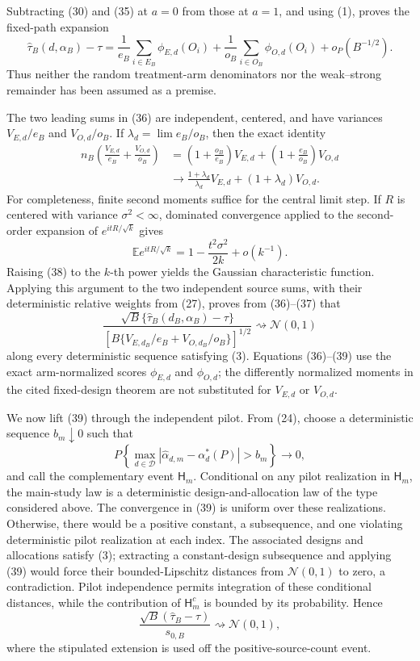 Subtracting (30) and (35) at \(a=0\) from those at \(a=1\), and using (1), proves the fixed-path expansion
\[
 \widehat\tau_B(d,\alpha_B)-\tau
 =\frac1{e_B}\sum_{i\in E_B}\phi_{E,d}(O_i)
  +\frac1{o_B}\sum_{i\in O_B}\phi_{O,d}(O_i)
  +o_P(B^{-1/2}).                                            \tag{36}
\]
Thus neither the random treatment-arm denominators nor the weak--strong remainder has been assumed as a premise.

The two leading sums in (36) are independent, centered, and have variances \(V_{E,d}/e_B\) and \(V_{O,d}/o_B\).  If \(\lambda_d=\lim e_B/o_B\), then the exact identity
\[
\begin{aligned}
 n_B\left(\frac{V_{E,d}}{e_B}+\frac{V_{O,d}}{o_B}\right)
 &=\left(1+\frac{o_B}{e_B}\right)V_{E,d}
  +\left(1+\frac{e_B}{o_B}\right)V_{O,d}\\
 &\longrightarrow
 \frac{1+\lambda_d}{\lambda_d}V_{E,d}
 +(1+\lambda_d)V_{O,d}.
\end{aligned}                                                \tag{37}
\]
For completeness, finite second moments suffice for the central limit step.  If \(R\) is centered with variance \(\sigma^2<\infty\), dominated convergence applied to the second-order expansion of \(e^{itR/\sqrt{k}}\) gives
\[
 \mathbb E e^{itR/\sqrt{k}}
 =1-\frac{t^2\sigma^2}{2k}+o(k^{-1}).                       \tag{38}
\]
Raising (38) to the \(k\)-th power yields the Gaussian characteristic function.  Applying this argument to the two independent source sums, with their deterministic relative weights from (27), proves from (36)--(37) that
\[
 \frac{\sqrt B\{\widehat\tau_B(d_B,\alpha_B)-\tau\}}
 {\left[B\{V_{E,d_B}/e_B+V_{O,d_B}/o_B\}\right]^{1/2}}
 \rightsquigarrow\mathcal N(0,1)                            \tag{39}
\]
along every deterministic sequence satisfying (3).  Equations (36)--(39) use the exact arm-normalized scores \(\phi_{E,d}\) and \(\phi_{O,d}\); the differently normalized moments in the cited fixed-design theorem are not substituted for \(V_{E,d}\) or \(V_{O,d}\).

We now lift (39) through the independent pilot.  From (24), choose a deterministic sequence \(b_m\downarrow0\) such that
\[
 P\left\{\max_{d\in\mathcal D}
 |\widehat\alpha_{d,m}-\alpha_d^*(P)|>b_m\right\}
 \longrightarrow0,                                         \tag{40}
\]
and call the complementary event \(\mathsf H_m\).  Conditional on any pilot realization in \(\mathsf H_m\), the main-study law is a deterministic design-and-allocation law of the type considered above.  The convergence in (39) is uniform over these realizations.  Otherwise, there would be a positive constant, a subsequence, and one violating deterministic pilot realization at each index.  The associated designs and allocations satisfy (3); extracting a constant-design subsequence and applying (39) would force their bounded-Lipschitz distances from \(\mathcal N(0,1)\) to zero, a contradiction.  Pilot independence permits integration of these conditional distances, while the contribution of \(\mathsf H_m^c\) is bounded by its probability.  Hence
\[
 \frac{\sqrt B(\widehat\tau_B-\tau)}{s_{0,B}}
 \rightsquigarrow\mathcal N(0,1),                           \tag{41}
\]
where the stipulated extension is used off the positive-source-count event.

